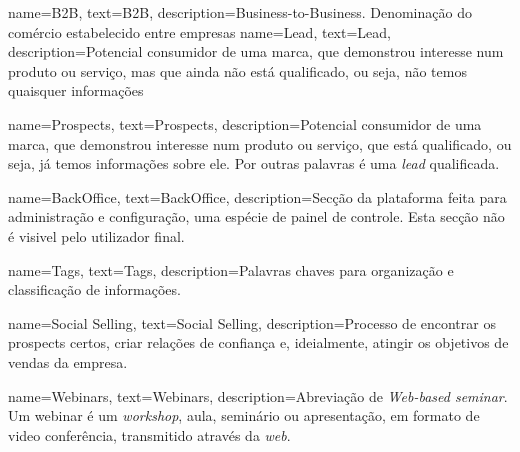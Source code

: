 {
        name=B2B,
        text=B2B,
        description={Business-to-Business. Denominação do comércio estabelecido entre empresas}
}
{
	name=Lead,
	text=Lead,
	description={Potencial consumidor de uma marca, que demonstrou interesse num produto ou serviço, mas que ainda não está qualificado, ou seja, não temos quaisquer informações}
}

{
	name=Prospects,
	text=Prospects,
	description={Potencial consumidor de uma marca, que demonstrou interesse num produto ou serviço, que está qualificado, ou seja, já temos informações sobre ele. Por outras palavras é uma \textit{lead} qualificada.}
}

{
	name=BackOffice,
	text=BackOffice,
	description={Secção da plataforma feita para administração e configuração, uma espécie de painel de controle. Esta secção não é visivel pelo utilizador final. }
}

{
	name=Tags,
	text=Tags,
	description={Palavras chaves para organização e classificação de informações. }
}

{
	name=Social Selling,
	text=Social Selling,
	description={Processo de encontrar os prospects certos, criar relações de confiança e, ideialmente, atingir os objetivos de vendas da empresa.}
}

{
	name=Webinars,
	text=Webinars,
	description={Abreviação de \textit{Web-based seminar}. Um webinar é um \textit{workshop}, aula, seminário ou apresentação, em formato de video conferência, transmitido através da \textit{web}.}
}
